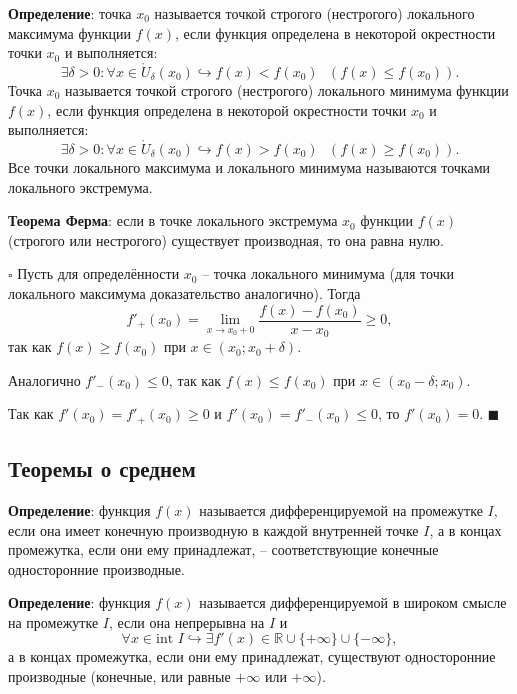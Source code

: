 \documentclass[12pt, a4paper, reqno]{article}
\begin{document}
    \textbf{Определение}: точка $x_0$ называется точкой строгого (нестрогого) локального максимума
    функции $f(x)$, если функция определена в некоторой окрестности точки $x_0$ и выполняется:
    \begin{equation*}
        \exists\delta > 0: \forall x\in \mathring U_{\delta}(x_0)\hookrightarrow f(x) < f(x_0)\ \ \
        (f(x) \leq f(x_0)).
    \end{equation*}
    Точка $x_0$ называется точкой строгого (нестрогого) локального минимума функции $f(x)$, если
    функция определена в некоторой окрестности точки $x_0$ и выполняется:
    \begin{equation*}
        \exists\delta > 0: \forall x\in \mathring U_{\delta}(x_0)\hookrightarrow f(x) > f(x_0)\ \ \
        (f(x) \geq f(x_0)).
    \end{equation*}
    Все точки локального максимума и локального минимума называются точками локального экстремума.

    \textbf{Теорема Ферма}: если в точке локального экстремума $x_0$ функции $f(x)$ (строгого или
    нестрогого) существует производная, то она равна нулю.

    $\square$ Пусть для определённости $x_0$ -- точка локального минимума (для точки локального
    максимума доказательство аналогично). Тогда
    \begin{equation*}
        f'_{+}(x_0) = \lim\limits_{x\to x_0 + 0} \dfrac{f(x) - f(x_0)}{x - x_0} \geq 0,
    \end{equation*}
    так как $f(x) \geq f(x_0)$ при $x\in(x_0; x_0 + \delta)$.

    Аналогично $f'_{-}(x_0) \leq 0$, так как $f(x) \leq f(x_0)$ при $x\in(x_0 - \delta; x_0)$.

    Так как $f'(x_0) = f'_{+}(x_0) \geq 0$  и $f'(x_0) = f'_{-}(x_0) \leq 0$, то $f'(x_0) = 0$.
    $\blacksquare$

\subsection{Теоремы о среднем}

    \textbf{Определение}: функция $f(x)$ называется дифференцируемой на промежутке $I$, если она
    имеет конечную производную в каждой внутренней точке $I$, а в концах промежутка, если они ему
    принадлежат, -- соответствующие конечные односторонние производные.

    \textbf{Определение}: функция $f(x)$ называется дифференцируемой в широком смысле на промежутке
    $I$, если она непрерывна на $I$ и
    \begin{equation*}
        \forall x \in \text{int }I \hookrightarrow \exists f'(x)\in
        \mathbb{R}\cup\{+\infty\}\cup\{-\infty\},
    \end{equation*}
    а в концах промежутка, если они ему принадлежат, существуют односторонние производные (конечные,
    или равные $+\infty$ или $+\infty$).
\end{document}
